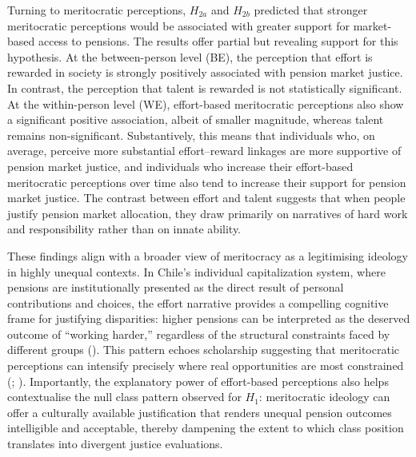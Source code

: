\documentclass[
  12pt,
]{article}
\begin{document}
Turning to meritocratic perceptions, \(H_{2a}\) and \(H_{2b}\) predicted
that stronger meritocratic perceptions would be associated with greater
support for market-based access to pensions. The results offer partial
but revealing support for this hypothesis. At the between-person level
(BE), the perception that effort is rewarded in society is strongly
positively associated with pension market justice. In contrast, the
perception that talent is rewarded is not statistically significant. At
the within-person level (WE), effort-based meritocratic perceptions also
show a significant positive association, albeit of smaller magnitude,
whereas talent remains non-significant. Substantively, this means that
individuals who, on average, perceive more substantial effort--reward
linkages are more supportive of pension market justice, and individuals
who increase their effort-based meritocratic perceptions over time also
tend to increase their support for pension market justice. The contrast
between effort and talent suggests that when people justify pension
market allocation, they draw primarily on narratives of hard work and
responsibility rather than on innate ability.

These findings align with a broader view of meritocracy as a
legitimising ideology in highly unequal contexts. In Chile's individual
capitalization system, where pensions are institutionally presented as
the direct result of personal contributions and choices, the effort
narrative provides a compelling cognitive frame for justifying
disparities: higher pensions can be interpreted as the deserved outcome
of ``working harder,'' regardless of the structural constraints faced by
different groups (). This pattern echoes scholarship suggesting that
meritocratic perceptions can intensify precisely where real
opportunities are most constrained
(;
). Importantly, the
explanatory power of effort-based perceptions also helps contextualise
the null class pattern observed for \(H_1\): meritocratic ideology can
offer a culturally available justification that renders unequal pension
outcomes intelligible and acceptable, thereby dampening the extent to
which class position translates into divergent justice evaluations.
\end{document}
